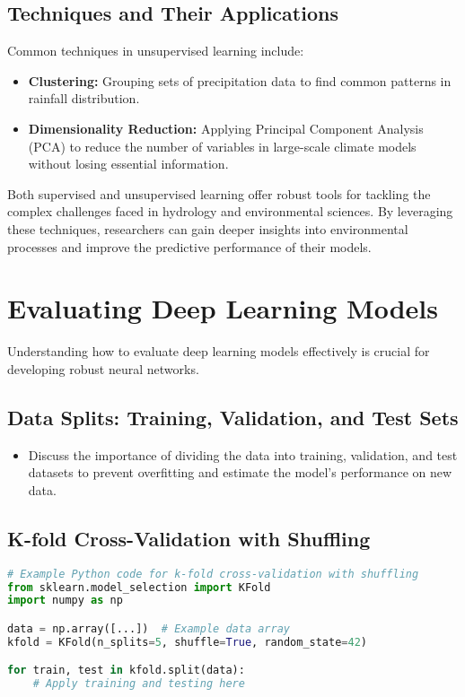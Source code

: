 \subsection{Techniques and Their Applications}
Common techniques in unsupervised learning include:

\begin{itemize}
    \item \textbf{Clustering:} Grouping sets of precipitation data to find common patterns in rainfall distribution.
    \item \textbf{Dimensionality Reduction:} Applying Principal Component Analysis (PCA) to reduce the number of variables in large-scale climate models without losing essential information.
\end{itemize}

Both supervised and unsupervised learning offer robust tools for tackling the complex challenges faced in hydrology and environmental sciences. By leveraging these techniques, researchers can gain deeper insights into environmental processes and improve the predictive performance of their models.






















\section{Evaluating Deep Learning Models}
Understanding how to evaluate deep learning models effectively is crucial for developing robust neural networks.

\subsection{Data Splits: Training, Validation, and Test Sets}
\begin{itemize}
    \item Discuss the importance of dividing the data into training, validation, and test datasets to prevent overfitting and estimate the model's performance on new data.
\end{itemize}

\subsection{K-fold Cross-Validation with Shuffling}
\begin{lstlisting}[language=Python]
# Example Python code for k-fold cross-validation with shuffling
from sklearn.model_selection import KFold
import numpy as np

data = np.array([...])  # Example data array
kfold = KFold(n_splits=5, shuffle=True, random_state=42)

for train, test in kfold.split(data):
    # Apply training and testing here
\end{lstlisting}

